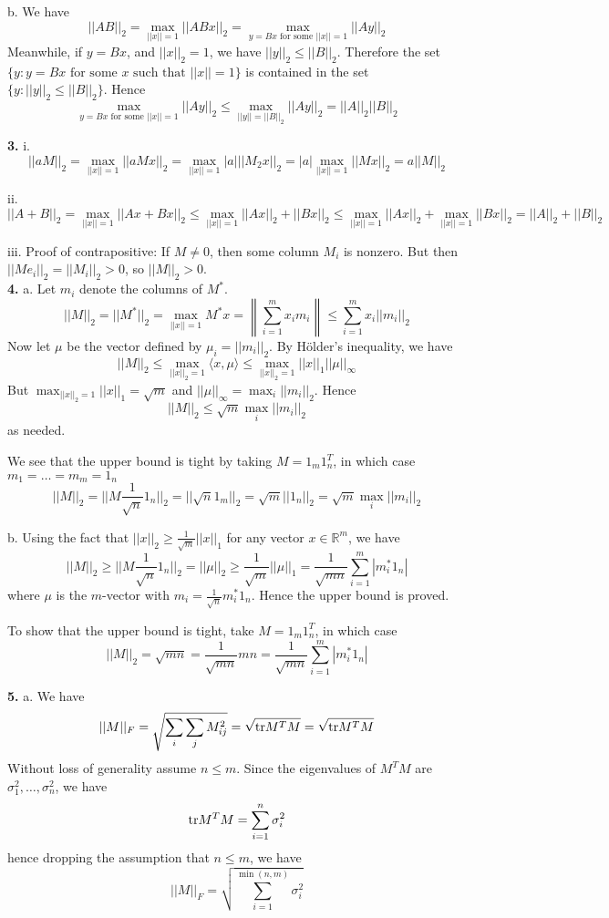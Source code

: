 \documentclass[11pt]{article}
\begin{document}
b.
We have
\[
||AB||_2 = \max_{||x|| = 1} ||ABx||_2 = \max_{y = Bx\text{ for some }||x|| = 1} ||Ay||_2
\]
Meanwhile, if $y = Bx$, and $||x||_2 = 1$, we have $||y||_2 \leq ||B||_2$.
Therefore the set
$\{y: y = Bx \text{ for some }x\text{ such that }||x||=1\}$
is contained in the set
$\{y: ||y||_2 \leq ||B||_2\}$.
Hence
\[
\max_{y = Bx\text{ for some }||x|| = 1} ||Ay||_2 \leq
\max_{||y|| = ||B||_2} ||Ay||_2 = ||A||_2 ||B||_2
\]

\noindent\textbf{3.}
i. 
\[
||aM||_2 = \max_{||x||=1} ||aMx||_2 = \max_{||x||=1} |a| ||M_2 x||_2 = |a|\max_{||x||=1} ||M x||_2 = a||M||_2
\]

ii.
\[
||A + B||_2 = \max_{||x|| = 1} ||Ax + Bx||_2 \leq \max_{||x||=1} ||Ax||_2 + ||Bx||_2
\leq \max_{||x|| = 1} ||Ax||_2 + \max_{||x||=1} ||Bx||_2 = ||A||_2 + ||B||_2
\]

iii.
Proof of contrapositive:
If $M \neq 0$, then some column $M_i$ is nonzero.
But then $||Me_i||_2 = ||M_i||_2 > 0$, so $||M||_2 > 0$.\\


\noindent\textbf{4.}
a.
Let $m_i$ denote the columns of $M^*$.
\[
||M||_2 = ||M^*||_2 = \max_{||x|| = 1} M^* x 
= \left \| \sum_{i=1}^m x_i m_i \right \|
\leq \sum_{i=1}^m x_i ||m_i||_2
\]
Now let $\mu$ be the vector defined by $\mu_i = ||m_i||_2$.
By H\"{o}lder's inequality, we have
\[
||M||_2 \leq \max_{||x||_2= 1} \langle x, \mu \rangle \leq \max_{||x||_2 = 1} ||x||_1 ||\mu||_\infty
\]
But $\max_{||x||_2 = 1} ||x||_1 = \sqrt{m}$ and $||\mu||_\infty = \max_i ||m_i||_2$.
Hence
\[
||M||_2 \leq \sqrt{m} \max_i ||m_i||_2
\]
as needed.

We see that the upper bound is tight by taking $M = 1_m 1_n^T$,
in which case $m_1 = \hdots = m_m = 1_n$ 
\[||M||_2 = ||M \frac{1}{\sqrt{n}}1_n||_2 = ||\sqrt{n} 1_m||_2 = \sqrt{m}||1_n||_2 = \sqrt{m} \max_i ||m_i||_2
\]

b.  Using the fact that $||x||_2 \geq \frac{1}{\sqrt{m}}
||x||_1$ for any vector $x \in \mathbb{R}^m$, we have
\[
||M||_2 \geq ||M\frac{1}{\sqrt{n}} 1_n||_2
= ||\mu||_2 \geq \frac{1}{\sqrt{m}} ||\mu||_1 = \frac{1}{\sqrt{mn}} \sum_{i=1}^m |m_i^* 1_n|
\]
where $\mu$ is the $m$-vector with $m_i = \frac{1}{\sqrt{n}} m_i^* 1_n$.
Hence the upper bound is proved.

To show that the upper bound is tight, take $M = 1_m 1_n^T$, in which case
\[
||M||_2 = \sqrt{mn} = \frac{1}{\sqrt{mn}} mn = \frac{1}{\sqrt{mn}}  \sum_{i=1}^m |m_i^* 1_n|
\]




\noindent\textbf{5.}
a.
We have
\[
||M||_F = \sqrt{\sum_i \sum_j M_{ij}^2} = \sqrt{\text{tr} M^T M} = \sqrt{\text{tr} M^T M}
\]
Without loss of generality assume $n \leq m$.
Since the eigenvalues of $M^T M$ are $\sigma_1^2,\hdots, \sigma_n^2$,
we have
\[
\text{tr} M^T M = \sum_{i=1}^n \sigma_i^2
\]
hence dropping the assumption that $n \leq m$, we have
\[
||M||_F = \sqrt{\sum_{i=1}^{\min(n, m)} \sigma_i^2}
\]
\end{document}
